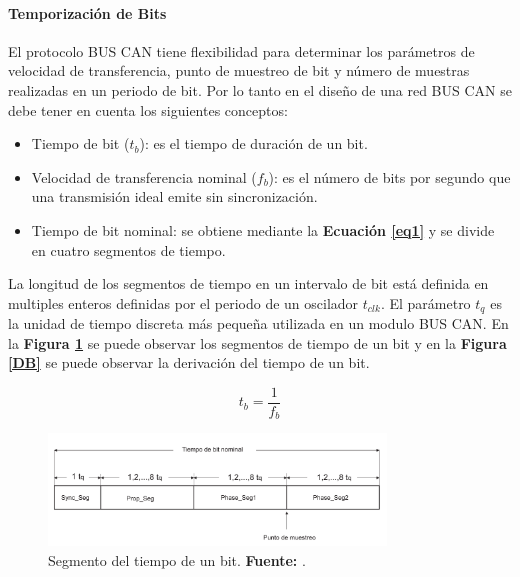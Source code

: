 \paragraph{Temporización de Bits}

 El protocolo BUS CAN tiene flexibilidad para determinar los parámetros de velocidad de transferencia, punto de muestreo de bit y número de muestras realizadas en un periodo de bit. Por lo tanto en el diseño de una red BUS CAN se debe tener en cuenta los siguientes conceptos:

\begin{itemize}

\item Tiempo de bit ($t_b$): es el tiempo de duración de un bit.
\item Velocidad de transferencia nominal ($f_b$): es el número de bits por segundo que una transmisión ideal emite sin sincronización.
\item Tiempo de bit nominal: se obtiene mediante la \textbf{Ecuación \ref{eq1}} y se divide en cuatro segmentos de tiempo.

\end{itemize}

La longitud de los segmentos de tiempo en un intervalo de bit está definida en multiples enteros definidas por el periodo de un  oscilador $t_{clk}$. El parámetro $t_q$ es la unidad de tiempo discreta más pequeña utilizada en un modulo BUS CAN. En la \textbf{Figura \ref{TB}} se puede observar los segmentos de tiempo de un bit y en la \textbf{Figura \ref{DB}} se puede observar la derivación del tiempo de un bit.

\begin {equation}
\label {eq1}
t_b = \frac {1}{f_b}
\end {equation}

\begin{figure}[H]
	\centering
		\includegraphics[width=0.8\textwidth]{./Cap2imagen/tiempo_bit.pdf}
	\caption[Segmento del tiempo de un bit.]{Segmento del tiempo de un bit.\textbf{ Fuente:} \cite{DSEEPC}.}
	\label{TB} %
\end{figure}

